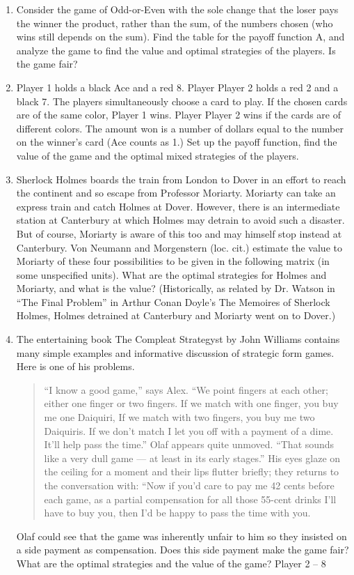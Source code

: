 \documentclass[]{report}
\begin{document}
\begin{enumerate}
\item Consider the game of Odd-or-Even with the sole change that the loser pays the
winner the product, rather than the sum, of the numbers chosen (who wins still depends
on the sum). Find the table for the payoff function A, and analyze the game to find the
value and optimal strategies of the players. Is the game fair?
\item  Player 1 holds a black Ace and a red 8. Player Player 2 holds a red 2 and a black 7. The
players simultaneously choose a card to play. If the chosen cards are of the same color,
Player 1 wins. Player Player 2 wins if the cards are of different colors. The amount won is a
number of dollars equal to the number on the winner’s card (Ace counts as 1.) Set up the
payoff function, find the value of the game and the optimal mixed strategies of the players.
\item  Sherlock Holmes boards the train from London to Dover in an effort to reach the
continent and so escape from Professor Moriarty. Moriarty can take an express train and
catch Holmes at Dover. However, there is an intermediate station at Canterbury at which
Holmes may detrain to avoid such a disaster. But of course, Moriarty is aware of this too
and may himself stop instead at Canterbury. Von Neumann and Morgenstern (loc. cit.)
estimate the value to Moriarty of these four possibilities to be given in the following matrix
(in some unspecified units).
What are the optimal strategies for Holmes and Moriarty, and what is the value? (Historically,
as related by Dr. Watson in “The Final Problem” in Arthur Conan Doyle’s The
Memoires of Sherlock Holmes, Holmes detrained at Canterbury and Moriarty went on to
Dover.)
\item  The entertaining book The Compleat Strategyst by John Williams contains many
simple examples and informative discussion of strategic form games. Here is one of his
problems.
\begin{quote}
“I know a good game,” says Alex. “We point fingers at each other; either
one finger or two fingers. If we match with one finger, you buy me one Daiquiri,
If we match with two fingers, you buy me two Daiquiris. If we don’t match I let
you off with a payment of a dime. It’ll help pass the time.”
Olaf appears quite unmoved. “That sounds like a very dull game — at least
in its early stages.” His eyes glaze on the ceiling for a moment and their lips flutter
briefly; they returns to the conversation with: “Now if you’d care to pay me 42
cents before each game, as a partial compensation for all those 55-cent drinks I’ll
have to buy you, then I’d be happy to pass the time with you.
\end{quote}
Olaf could see that the game was inherently unfair to him so they insisted on a side
payment as compensation. Does this side payment make the game fair? What are the
optimal strategies and the value of the game?
Player 2 – 8
\end{enumerate}
\end{document}

